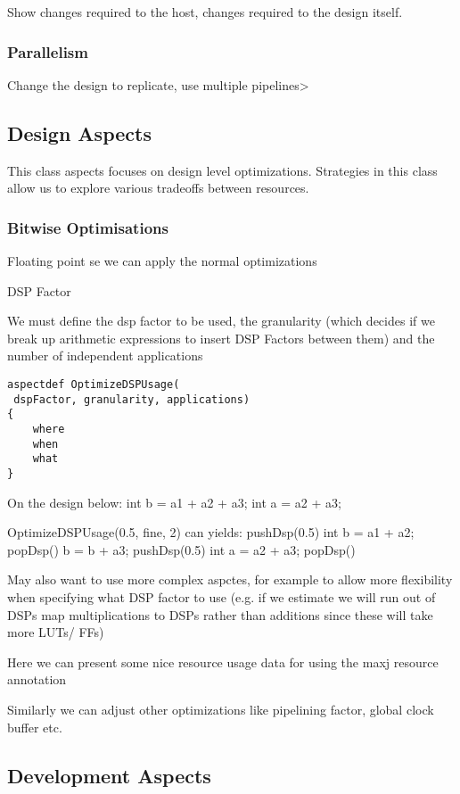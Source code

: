 Show changes required to the host, changes required to the design itself.

\subsubsection{Parallelism}

Change the design to replicate, use multiple pipelines>

\subsection{Design Aspects}
This class aspects focuses on design level optimizations. Strategies
in this class allow us to explore various tradeoffs between resources.

\subsubsection{Bitwise Optimisations}

Floating point se we can apply the normal optimizations

DSP Factor

We must define the dsp factor to be used, the granularity (which
decides if we break up arithmetic expressions to insert DSP Factors
between them) and the number of independent applications

\lstset{style=aspectp}
\begin{lstlisting}
aspectdef OptimizeDSPUsage(
 dspFactor, granularity, applications)
{
    where
    when
    what
}
\end{lstlisting}

On the design below:
int b = a1 + a2 + a3;
int a = a2 + a3;

OptimizeDSPUsage(0.5, fine, 2) can yields:
pushDsp(0.5)
int b = a1 + a2;
popDsp()
b = b + a3;
pushDsp(0.5)
int a = a2 + a3;
popDsp()

May also want to use more complex aspctes, for example to
allow more flexibility when specifying what DSP factor to use
(e.g. if we estimate we will run out of DSPs map
multiplications to DSPs rather than additions since these will
take more LUTs/ FFs)

Here we can present some nice resource usage data for using the maxj resource annotation



Similarly we can adjust other optimizations like pipelining factor, global clock buffer etc.


\subsection{Development Aspects}

